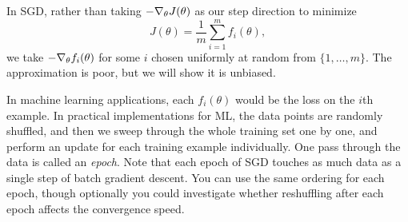 \documentclass{article}
\begin{document}
In SGD, rather than taking $-\nabla_{\theta} J(\theta)$
as our step direction to minimize 
\[
J(\theta)=\frac{1}{m}\sum_{i=1}^{m}f_{i}(\theta), 
\]
we take $-\nabla_\theta f_{i}(\theta)$ for some $i$
chosen uniformly at random from $\{1,\ldots,m\}$. The approximation
is poor, but we will show it is unbiased. 

In machine learning applications, each $f_{i}(\theta)$
would be the loss on the $i$th example. In
practical implementations for ML, the data points are randomly shuffled, and then we sweep through the whole training set one by
one, and perform an update for each training example individually.
One pass through the data is called an \emph{epoch}. Note that each
epoch of SGD touches as much data as a single step of batch gradient
descent. You can use the same ordering for each epoch, though optionally
you could investigate whether reshuffling after each epoch affects
the convergence speed. 
\end{document}
